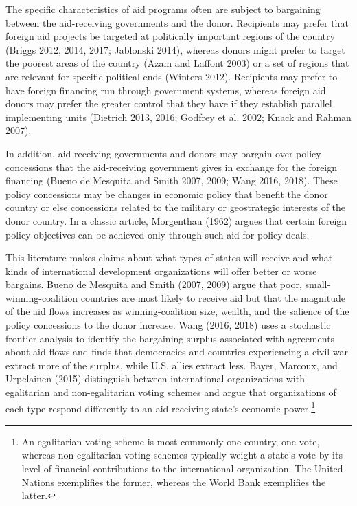 \documentclass{article}
\begin{document}
The specific characteristics of aid programs often are subject to bargaining between the aid-receiving governments and the donor.  Recipients may prefer that foreign aid projects be targeted at politically important regions of the country (Briggs 2012, 2014, 2017; Jablonski 2014), whereas donors might prefer to target the poorest areas of the country (Azam and Laffont 2003) or a set of regions that are relevant for specific political ends (Winters 2012).  Recipients may prefer to have foreign financing run through government systems, whereas foreign aid donors may prefer the greater control that they have if they establish parallel implementing units (Dietrich 2013, 2016; Godfrey et al. 2002; Knack and Rahman 2007). 

In addition, aid-receiving governments and donors may bargain over policy concessions that the aid-receiving government gives in exchange for the foreign financing (Bueno de Mesquita and Smith 2007, 2009; Wang 2016, 2018).  These policy concessions may be changes in economic policy that benefit the donor country or else concessions related to the military or geostrategic interests of the donor country.  In a classic article, Morgenthau (1962) argues that certain foreign policy objectives can be achieved only through such aid-for-policy deals. 

This literature makes claims about what types of states will receive and what kinds of international development organizations will offer better or worse bargains.  Bueno de Mesquita and Smith (2007, 2009) argue that poor, small-winning-coalition countries are most likely to receive aid but that the magnitude of the aid flows increases as winning-coalition size, wealth, and the salience of the policy concessions to the donor increase.  Wang (2016, 2018) uses a stochastic frontier analysis to identify the bargaining surplus associated with agreements about aid flows and finds that democracies and countries experiencing a civil war extract more of the surplus, while U.S. allies extract less.  Bayer, Marcoux, and Urpelainen (2015) distinguish between international organizations with egalitarian and non-egalitarian voting schemes and argue that organizations of each type respond differently to an aid-receiving state’s economic power.\footnote{An egalitarian voting scheme is most commonly one country, one vote, whereas non-egalitarian voting schemes typically weight a state’s vote by its level of financial contributions to the international organization.  The United Nations exemplifies the former, whereas the World Bank exemplifies the latter.}   
\end{document}
